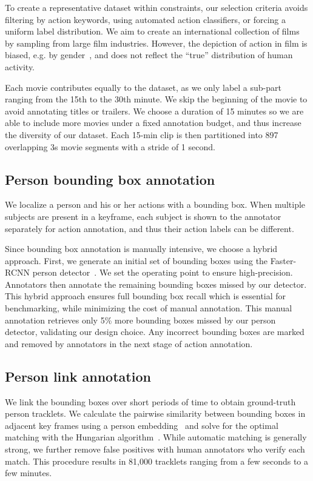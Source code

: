 \documentclass[10pt,twocolumn,letterpaper]{article}
\begin{document}
To create a representative dataset within constraints, our selection criteria avoids filtering by action keywords, using automated action classifiers, or forcing a uniform label distribution. We aim to create an international collection of films by sampling from large film industries. However, the depiction of action in film is biased, e.g. by gender~\cite{geena_davis_2016}, and does not reflect the ``true'' distribution of human activity. 

Each movie contributes equally to the dataset, as we only label a sub-part ranging from the 15th to the 30th minute. We skip the beginning of the movie to avoid annotating titles or trailers. We choose a duration of 15 minutes so we are able to include more movies under a fixed annotation budget, and thus increase the diversity of our dataset. Each 15-min clip is then partitioned into 897 overlapping 3s movie segments with a stride of 1 second.

\subsection{Person bounding box annotation}

We localize a person and his or her actions with a bounding box. When multiple subjects are present in a keyframe, each subject is shown to the annotator separately for action annotation, and thus their action labels can be different.

Since bounding box annotation is manually intensive, we choose a hybrid approach. First, we generate an initial set of bounding boxes using the Faster-RCNN person detector~\cite{ren2015faster}. We set the operating point to ensure high-precision. Annotators then  annotate the remaining bounding boxes missed by our detector. This hybrid approach ensures full bounding box recall which is essential for benchmarking, while minimizing the cost of manual annotation. This manual annotation retrieves only 5\% more bounding boxes missed by our person detector, validating our design choice. Any incorrect bounding boxes are marked and removed by annotators in the next stage of action annotation.

\subsection{Person link annotation}

We link the bounding boxes over short periods of time to obtain ground-truth person tracklets. We calculate the pairwise similarity between bounding boxes in adjacent key frames using a person embedding~\cite{wu2016personnet} and solve for the optimal matching with the Hungarian algorithm~\cite{kuhn1955hungarian}. While automatic matching is generally strong, we further remove false positives with human annotators who verify each match. This procedure results in 81,000 tracklets ranging from a few seconds to a few minutes. 
\end{document}

